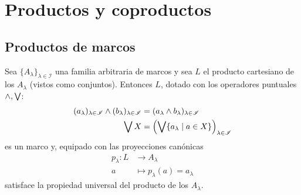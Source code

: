 \chapter{Productos y coproductos}
\section{Productos de marcos}

\begin{theorem}
    Sea $\{A_\lambda\}_{\lambda\in\mathscr{I}}$ una familia arbitraria
    de marcos y sea $L$ el producto cartesiano de los $A_\lambda$
    (vistos como conjuntos).
    Entonces $L$, dotado con los operadores puntuales $\wedge,\bigvee$:
    \begin{align*}
      (a_\lambda)_{\lambda\in\mathscr I}
      \wedge
      (b_\lambda)_{\lambda\in\mathscr I}
      &=
      (a_\lambda \wedge b_\lambda)_{\lambda\in\mathscr I} \\
      \bigvee X
      &= \left(\bigvee\{a_\lambda \mid a\in X\}\right)_{\lambda\in\mathscr I}
    \end{align*}
    es un marco y, equipado con las proyecciones canónicas
    \begin{align*}
        p_\lambda: L&\to A_\lambda \\
        a &\mapsto p_\lambda(a)=a_\lambda
    \end{align*}
    satisface la propiedad universal del producto de los $A_\lambda$.
\end{theorem}

